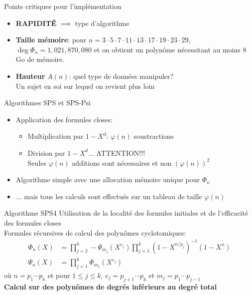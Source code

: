 \documentclass{beamer}
\begin{document}
	\begin{frame}{Points critiques pour l'implémentation}
		\begin{itemize}
			\item \textbf{RAPIDITÉ} $\implies$ type d'algorithme
			\item \textbf{Taille mémoire}: pour $n = 3 \cdot 5 \cdot 7 \cdot 11 \cdot 13 \cdot 17 \cdot 19 \cdot 23 \cdot 29$, $\deg \Phi_n = 1,021,870,080$ et on obtient un polynôme nécessitant au moins 8 Go de mémoire.
			\item \textbf{Hauteur} $A(n)$: quel type de données manipuler?\\
			Un sujet en soi sur lequel on revient plus loin		
		\end{itemize}
	\end{frame}

	\begin{frame}{Algorithmes SPS et SPS-Psi}
		\begin{itemize}
			\item 
			Application des formules closes:
			\begin{itemize}
				\item Multiplication par $1-X^d$: $\varphi(n)$ soustractions
				\item Division par $1-X^d$... ATTENTION!!!\\
				Seules $\varphi(n)$ additions sont nécessaires et non $\left(\varphi(n)\right)^2$
			\end{itemize}
			\item Algorithme simple avec une allocation mémoire unique pour $\Phi_n$
			\item... mais tous les calculs sont effectués sur un tableau de taille $\varphi(n)$
		\end{itemize}		
		
	\end{frame}

	\begin{frame}{Algorithme SPS4}
	Utilisation de la localité des formules initiales et de l'efficacité des formules closes\\
	
	Formules récursives de calcul des polynômes cyclotomiques:	
	\begin{align*}
		\Phi_n(X) &=\prod_{j=2}^{k} - \Psi_{m_j}(X^{e_j}) \prod_{j=1}^{k} (1-X^{n/p_j})^{-1}(1-X^n)\tag{3.17}\label{recurphi}\\
		\Psi_{n}(X) &=\prod_{j=1}^{k} \Phi_{m_j}(X^{e_j})\tag{3.25}\label{recurpsi}
	\end{align*}
	où $n = p_1 \cdots p_k$ et pour $1 \le j \le k$, $e_j = p_{j+1} \cdots p_k$ et $m_j = p_1 \cdots p_{j-1}$\\
	\textbf{Calcul sur des polynômes de degrés inférieurs au degré total}
	
	\end{frame}
\end{document}
